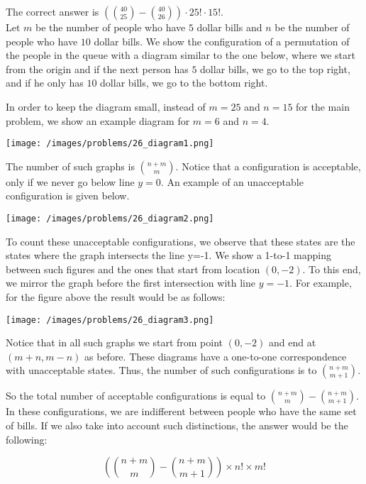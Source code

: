 \begin{solution}
The correct answer is $
(\binom{40 }{25} - \binom{40}{26}) \cdot 25! \cdot 15!$.\\[0.2cm]

Let $m$ be the number of people who have $5$ dollar bills and $n$ be the number of people who have $10$ dollar bills.
We show the configuration of a permutation of the people in the queue with a diagram similar to the one below, where we start from the origin and if the next person has $5$ dollar bills, we go to the top right, and if he only has $10$ dollar bills, we go to the bottom right.

In order to keep the diagram small, instead of $m=25$ and $n=15$ for the main problem,  we show an example diagram for  $m=6$ and $n=4$. 

\begin{center}
	\texttt{[image: /images/problems/26\_diagram1.png]}
\end{center}

The number of such graphs is ${n+m \choose m}$. Notice that a configuration is acceptable, only if we never go below line $y=0$. An example of an unacceptable configuration is given below.

\begin{center}
	\texttt{[image: /images/problems/26\_diagram2.png]}
\end{center}

To count these unacceptable configurations, we observe that these states are the states where the graph intersects the line y=-1. We show a 1-to-1 mapping between such figures and the ones that start from location $(0,-2)$. To this end, we mirror the graph before the first intersection with line $y=-1$. For example, for the figure above the result would be as follows:

\begin{center}
	\texttt{[image: /images/problems/26\_diagram3.png]}
\end{center}

Notice that in all such graphs we start from point $(0,-2)$ and end at $(m+n, m-n)$ as before. These diagrams have a one-to-one correspondence with unacceptable states. Thus, the number of such configurations is to ${n+m \choose m+1}$.

So the total number of acceptable configurations is equal to ${n+m \choose m} - {n+m \choose m+1}$. In these configurations, we are indifferent between people who have the same set of bills.
If we also take into account such distinctions, the answer would be the following:

$$
({n+m \choose m} - {n+m \choose m+1}) \times n! \times m!
$$



\end{solution}

